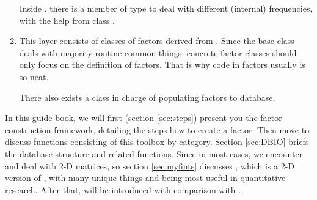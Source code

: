 \begin{enumerate}
        Inside , there is a member of type  to deal with different (internal)
        frequencies, with the help from class .

   \item This layer consists of classes of factors derived from .
        Since the base class  deals with majority routine common things,
        concrete factor classes should only focus on the definition of factors.
        That is why code in factors usually is so neat.

        There also exists a class  in charge of populating factors to database.
\end{enumerate}


In this guide book,
we will first (section \ref{sec:steps}) present you the factor construction framework, detailing the steps how to create a factor.
Then move to discuss functions consisting of this toolbox by category.
Section \ref{sec:DBIO} briefs the database structure and related functions.
Since in most cases, we encounter and deal with 2-D matrices,
so section \ref{sec:myfints} discusses , 
which is a 2-D version of ,
with many unique things and being most useful in quantitative research.
After that,  will be introduced with comparison with .







